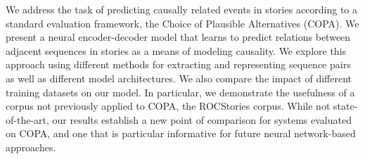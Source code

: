 We address the task of predicting causally related events in stories according to a standard evaluation framework, the Choice of Plausible Alternatives (COPA). We present a neural encoder-decoder model that learns to predict relations between adjacent sequences in stories as a means of modeling causality. We explore this approach using different methods for extracting and representing sequence pairs as well as different model architectures. We also compare the impact of different training datasets on our model. In particular, we demonstrate the usefulness of a corpus not previously applied to COPA, the ROCStories corpus. While not state-of-the-art, our results establish a new point of comparison for systems evaluated on COPA, and one that is particular informative for future neural network-based approaches.
